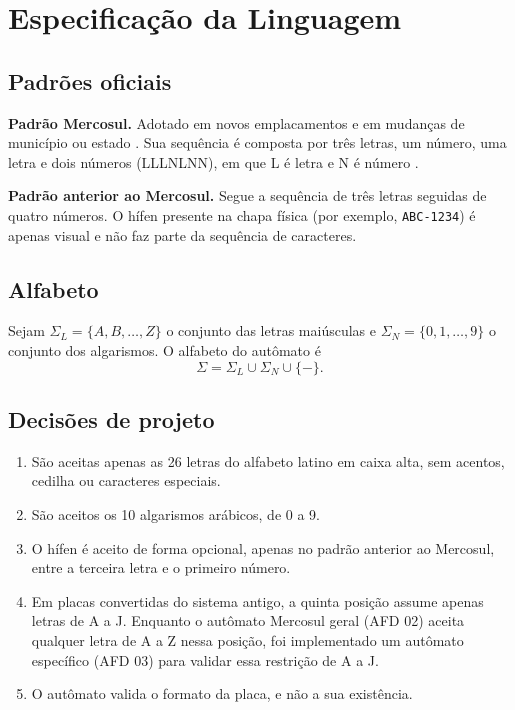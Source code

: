 \section{Especificação da Linguagem}
\label{sec:especificacao}

\subsection{Padrões oficiais}

\textbf{Padrão Mercosul.} Adotado em novos emplacamentos e em
mudanças de município ou estado \cite{contran780}. Sua sequência é
composta por três letras, um número, uma letra e dois números
(LLLNLNN), em que L é letra e N é número \cite{contran741}.

\textbf{Padrão anterior ao Mercosul.} Segue a sequência de
três letras seguidas de quatro números. O hífen presente na
chapa física (por exemplo, \texttt{ABC-1234}) é apenas visual e não
faz parte da sequência de caracteres.

\subsection{Alfabeto}

Sejam $\Sigma_L = \{A, B, \dots, Z\}$ o conjunto das letras
maiúsculas e $\Sigma_N = \{0, 1, \dots, 9\}$ o conjunto dos
algarismos. O alfabeto do autômato é
\[
  \Sigma = \Sigma_L \cup \Sigma_N \cup \{-\}.
\]

\subsection{Decisões de projeto}

\begin{enumerate}
  \item São aceitas apenas as 26 letras do alfabeto latino em caixa
        alta, sem acentos, cedilha ou caracteres especiais.
  \item São aceitos os 10 algarismos arábicos, de 0 a 9.
  \item O hífen é aceito de forma opcional, apenas no padrão anterior
        ao Mercosul, entre a terceira letra e o primeiro número.
  \item Em placas convertidas do sistema antigo, a quinta posição
        assume apenas letras de A a J. Enquanto o autômato Mercosul
        geral (AFD 02) aceita qualquer letra de A a Z nessa posição,
        foi implementado um autômato específico (AFD 03) para validar
        essa restrição de A a J.
  \item O autômato valida o formato da placa, e não a sua existência.
\end{enumerate}

